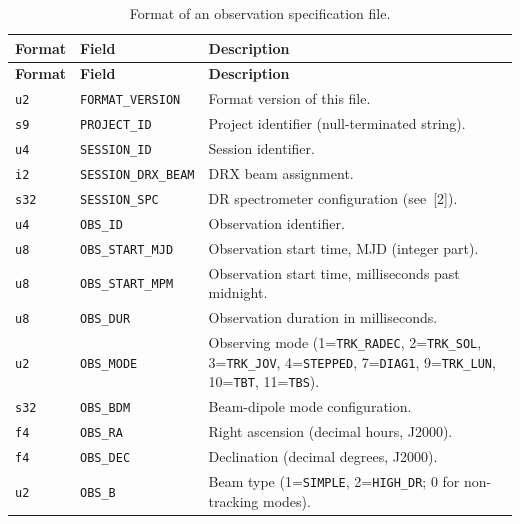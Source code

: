\begin{longtable}{|l|l|p{8cm}|}
\caption{Format of an observation specification file.}
\label{tab:obs-format} \\
\hline
\textbf{Format} & \textbf{Field} & \textbf{Description} \\
\hline
\endfirsthead

\hline
\textbf{Format} & \textbf{Field} & \textbf{Description} \\
\hline
\endhead

\hline
\endfoot

\texttt{u2} & \texttt{FORMAT\_VERSION}      & Format version of this file. \\
\hline
\texttt{s9} & \texttt{PROJECT\_ID}          & Project identifier (null-terminated string). \\
\hline
\texttt{u4} & \texttt{SESSION\_ID}          & Session identifier. \\
\hline
\texttt{i2} & \texttt{SESSION\_DRX\_BEAM}   & DRX beam assignment. \\
\hline
\texttt{s32} & \texttt{SESSION\_SPC}        & DR spectrometer configuration (see~[2]). \\
\hline
\texttt{u4} & \texttt{OBS\_ID}              & Observation identifier. \\
\hline
\texttt{u8} & \texttt{OBS\_START\_MJD}      & Observation start time, MJD (integer part). \\
\hline
\texttt{u8} & \texttt{OBS\_START\_MPM}      & Observation start time, milliseconds past midnight. \\
\hline
\texttt{u8} & \texttt{OBS\_DUR}             & Observation duration in milliseconds. \\
\hline
\texttt{u2} & \texttt{OBS\_MODE}            & Observing mode (1=\texttt{TRK\_RADEC}, 2=\texttt{TRK\_SOL}, 3=\texttt{TRK\_JOV}, 4=\texttt{STEPPED}, 7=\texttt{DIAG1}, 9=\texttt{TRK\_LUN}, 10=\texttt{TBT}, 11=\texttt{TBS}). \\
\hline
\texttt{s32} & \texttt{OBS\_BDM}            & Beam-dipole mode configuration. \\
\hline
\texttt{f4} & \texttt{OBS\_RA}              & Right ascension (decimal hours, J2000). \\
\hline
\texttt{f4} & \texttt{OBS\_DEC}             & Declination (decimal degrees, J2000). \\
\hline
\texttt{u2} & \texttt{OBS\_B}               & Beam type (1=\texttt{SIMPLE}, 2=\texttt{HIGH\_DR}; 0 for non-tracking modes). \\
\hline

\end{longtable}
